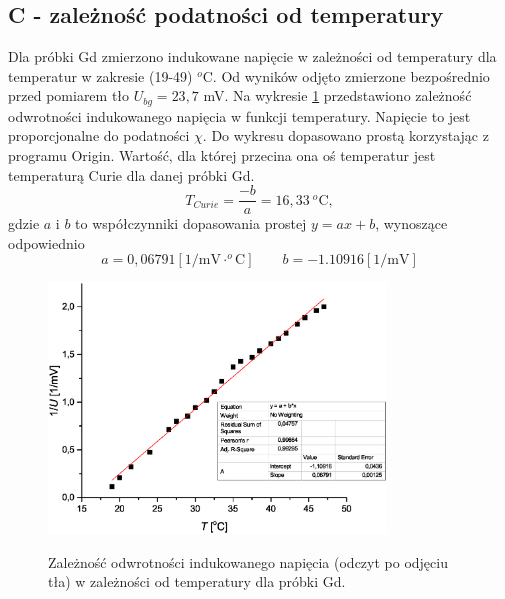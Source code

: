 \documentclass[11pt]{article}
\begin{document}
\subsection*{C - zależność podatności od temperatury}
Dla próbki Gd zmierzono indukowane napięcie w zależności od temperatury dla temperatur w zakresie (19-49) $^o$C. Od wyników odjęto zmierzone bezpośrednio przed
pomiarem tło $U_{bg}=23,7$ mV. Na wykresie \ref{ww2} przedstawiono zależność odwrotności indukowanego napięcia w funkcji temperatury. Napięcie to jest proporcjonalne
do podatności $\chi$. Do wykresu dopasowano prostą korzystając z programu Origin. Wartość, dla której przecina ona oś temperatur jest temperaturą Curie dla danej próbki Gd. 
$$ T_{Curie} = \frac{-b}{a} = 16,33\ ^o\mbox{C},$$
gdzie $a$ i $b$ to współczynniki dopasowania prostej $y=ax+b$, wynoszące odpowiednio
$$ a= 0,06791 [\mbox{1/mV}\cdot ^o\mbox{C}] \qquad b=-1.10916 [\mbox{1/mV}] $$
\begin{figure}[h!]
\centering
\includegraphics[width=0.8\textwidth]{./img/Gd.eps}
\caption{Zależność odwrotności indukowanego napięcia (odczyt po odjęciu tła) w zależności od temperatury dla próbki Gd.}{\label{ww2}}
\end{figure}
\end{document}
